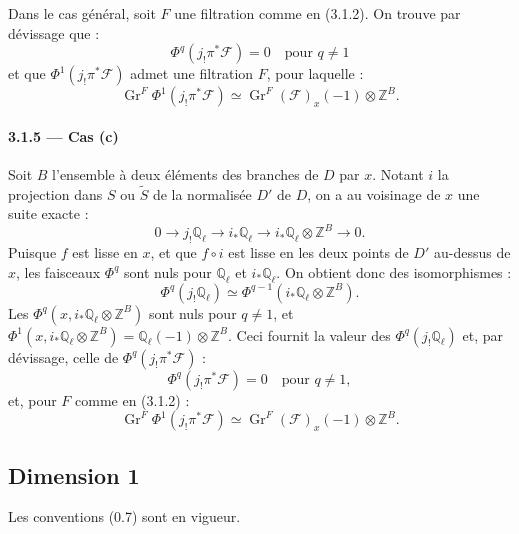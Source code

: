 \documentclass[12pt,a4paper]{article}
\theoremstyle{plain}
\theoremstyle{definition}
\theoremstyle{remark}
\DeclareMathOperator{\Gr}{Gr}
\newcommand{\QQ}{{\mathbb{Q}}}
\newcommand{\ZZ}{{\mathbb{Z}}}
\begin{document}
Dans le cas g\'en\'eral, soit $F$ une filtration comme en (3.1.2). On trouve par d\'evissage que :
\begin{equation}\label{eq:3.1.4.5}
\Phi^q(j_! \pi^*\mathscr{F}) = 0 \quad \text{pour } q \neq 1
\end{equation}
et que $\Phi^1(j_! \pi^*\mathscr{F})$ admet une filtration $F$, pour laquelle :
\begin{equation}\label{eq:3.1.4.6}
\Gr^F \Phi^1(j_! \pi^*\mathscr{F}) \simeq \Gr^F(\mathscr{F})_x(-1) \otimes \ZZ^B.
\end{equation}


\paragraph{3.1.5 --- Cas (c)}
Soit $B$ l'ensemble \`a deux \'el\'ements des branches de $D$ par $x$. Notant $i$ la projection dans $S$ ou $\widetilde{S}$ de la normalis\'ee $D'$ de $D$, on a au voisinage de $x$ une suite exacte :
\begin{equation}\label{eq:3.1.5.1}
0 \to j_! \QQ_\ell \to i_* \QQ_\ell \to i_* \QQ_\ell \otimes \ZZ^B \to 0.
\end{equation}
Puisque $f$ est lisse en $x$, et que $f \circ i$ est lisse en les deux points de $D'$ au-dessus de $x$, les faisceaux $\Phi^q$ sont nuls pour $\QQ_\ell$ et $i_* \QQ_\ell$. On obtient donc des isomorphismes :
\begin{equation}\label{eq:3.1.5.2}
\Phi^q(j_! \QQ_\ell) \simeq \Phi^{q-1}(i_* \QQ_\ell \otimes \ZZ^B).
\end{equation}
Les $\Phi^q(x, i_* \QQ_\ell \otimes \ZZ^B)$ sont nuls pour $q \neq 1$, et $\Phi^1(x, i_* \QQ_\ell \otimes \ZZ^B) = \QQ_\ell(-1) \otimes \ZZ^B$. Ceci fournit la valeur des $\Phi^q(j_! \QQ_\ell)$ et, par d\'evissage, celle de $\Phi^q(j_! \pi^*\mathscr{F})$ :
\begin{equation}\label{eq:3.1.5.3}
\Phi^q(j_! \pi^*\mathscr{F}) = 0 \quad \text{pour } q \neq 1,
\end{equation}
et, pour $F$ comme en (3.1.2) :
\begin{equation}\label{eq:3.1.5.4}
\Gr^F \Phi^1(j_! \pi^*\mathscr{F}) \simeq \Gr^F(\mathscr{F})_x(-1) \otimes \ZZ^B.
\end{equation}


\subsection{Dimension 1}

Les conventions (0.7) sont en vigueur.
\end{document}
